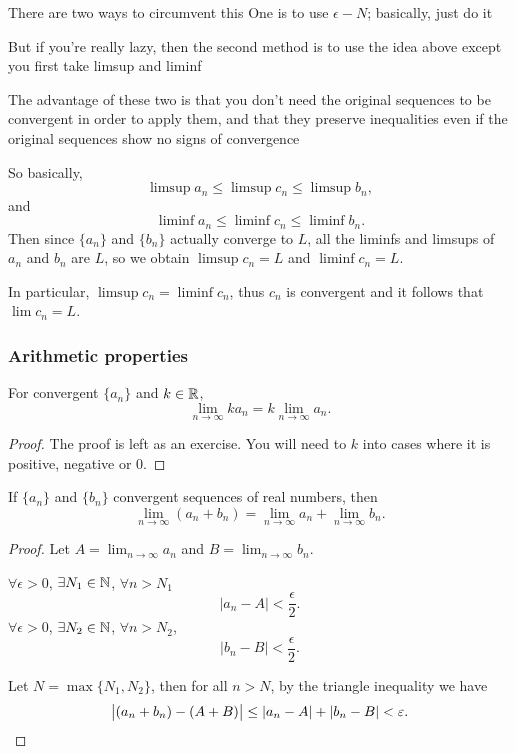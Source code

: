 There are two ways to circumvent this
One is to use $\epsilon-N$; basically, just do it

But if you're really lazy, then the second method is to use the idea above except you first take limsup and liminf

The advantage of these two is that you don't need the original sequences to be convergent in order to apply them, and that they preserve inequalities even if the original sequences show no signs of convergence

So basically,
\[ \limsup a_n\le\limsup c_n\le\limsup b_n, \]
and
\[ \liminf a_n\le\liminf c_n\le\liminf b_n. \]
Then since $\{a_n\}$ and $\{b_n\}$ actually converge to $L$, all the liminfs and limsups of $a_n$ and $b_n$ are $L$, so we obtain $\limsup c_n=L$ and $\liminf c_n=L$.

In particular, $\limsup c_n=\liminf c_n$, thus $c_n$ is convergent and it follows that $\lim c_n=L$.

\subsubsection{Arithmetic properties}
\begin{proposition}\label{prop:limit-scalarmultiplication}
For convergent $\{a_n\}$ and $k\in\mathbb R$,
\begin{equation}
\lim_{n\to\infty} ka_n=k\lim_{n\to\infty}a_n.
\end{equation}
\end{proposition}

\begin{proof}
The proof is left as an exercise. You will need to $k$ into cases where it is positive, negative or $0$.
\end{proof}

\begin{proposition}\label{prop:limit-addition}
If $\{a_n\}$ and $\{b_n\}$ convergent sequences of real numbers, then
\begin{equation}
\lim_{n\to\infty}(a_n+b_n)=\lim_{n\to\infty}a_n+\lim_{n\to\infty}b_n.
\end{equation}
\end{proposition}

\begin{proof}
Let $A=\lim_{n\to\infty}a_n$ and $B=\lim_{n\to\infty}b_n$.

$\forall\epsilon>0$, $\exists N_1\in\mathbb N$, $\forall n>N_1$
\[ |a_n-A|<\frac{\epsilon}{2}. \]
$\forall\epsilon>0$, $\exists N_2\in\mathbb N$, $\forall n>N_2$, 
\[ |b_n-B|<\frac{\epsilon}{2}. \]

Let $N=\max\{N_1,N_2\}$, then for all $n>N$, by the triangle inequality we have
\[ \left|(a_n+b_n)-(A+B)\right|\le|a_n-A|+|b_n-B|<\varepsilon. \]
\end{proof}

